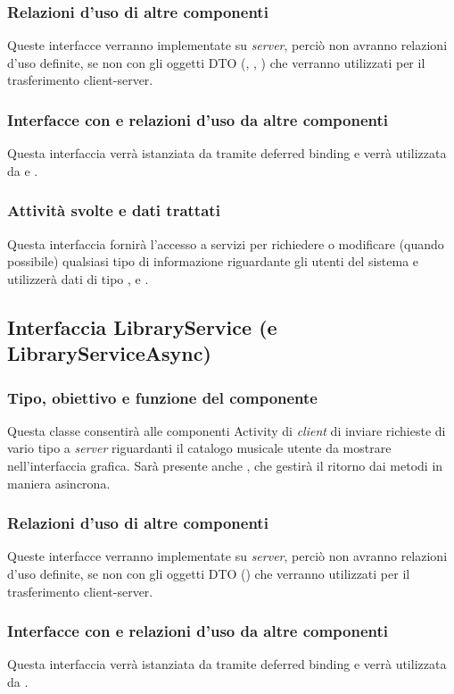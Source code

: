 \subsubsection*{Relazioni d'uso di altre componenti}
Queste interfacce verranno implementate su \emph{server}, perci\`o non
avranno relazioni d'uso definite, se non con gli oggetti DTO (,
, ) che verranno utilizzati per il
trasferimento client-server.

\subsubsection*{Interfacce con e relazioni d'uso da altre componenti}
Questa interfaccia verr\`a istanziata da  tramite deferred
binding e verr\`a utilizzata da  e .

\subsubsection*{Attivit\`a svolte e dati trattati}
Questa interfaccia fornir\`a l'accesso a servizi per richiedere o
modificare (quando possibile) qualsiasi tipo di informazione riguardante gli
utenti del sistema e utilizzer\`a dati di tipo , 
e .

\subsection{Interfaccia LibraryService (e LibraryServiceAsync)}
\subsubsection*{Tipo, obiettivo e funzione del componente}
Questa classe consentir\`a alle componenti Activity di \emph{client} di inviare
richieste di vario tipo a \emph{server} riguardanti il catalogo musicale utente
da mostrare nell'interfaccia grafica. Sar\`a presente anche
, che gestir\`a il ritorno dai metodi in maniera
asincrona.
\subsubsection*{Relazioni d'uso di altre componenti}
Queste interfacce verranno implementate su \emph{server}, perci\`o non
avranno relazioni d'uso definite, se non con gli oggetti DTO
() che verranno utilizzati per il trasferimento
client-server.
\subsubsection*{Interfacce con e relazioni d'uso da altre componenti}
Questa interfaccia verr\`a istanziata da  tramite deferred
binding e verr\`a utilizzata da .
